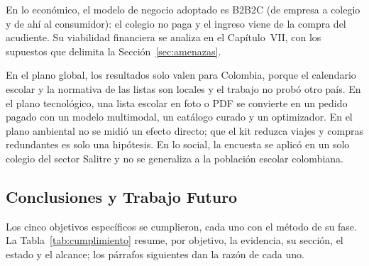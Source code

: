 En lo económico, el modelo de negocio adoptado \citep{osterwalder_business_2010} es B2B2C (de empresa a colegio y de ahí al consumidor): el colegio no paga y el ingreso viene de la compra del acudiente. Su viabilidad financiera se analiza en el Capítulo~VII, con los supuestos que delimita la Sección~\ref{sec:amenazas}.

En el plano global, los resultados solo valen para Colombia, porque el calendario escolar y la normativa de las listas son locales y el trabajo no probó otro país. En el plano tecnológico, una lista escolar en foto o PDF se convierte en un pedido pagado con un modelo multimodal, un catálogo curado y un optimizador. En el plano ambiental no se midió un efecto directo; que el kit reduzca viajes y compras redundantes es solo una hipótesis. En lo social, la encuesta se aplicó en un solo colegio del sector Salitre y no se generaliza a la población escolar colombiana.

\subsection{Conclusiones y Trabajo Futuro}

Los cinco objetivos específicos se cumplieron, cada uno con el método de su fase. La Tabla~\ref{tab:cumplimiento} resume, por objetivo, la evidencia, su sección, el estado y el alcance; los párrafos siguientes dan la razón de cada uno.

